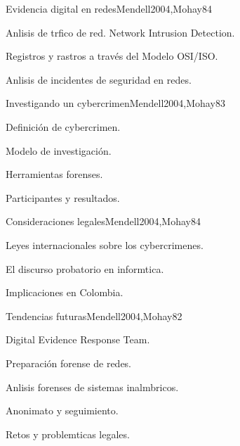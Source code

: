 \begin{syllabus}
\begin{unit}{Evidencia digital en redes}{Mendell2004,Mohay}{8}{4}
\begin{topics}
      \item {Anlisis de trfico de red. Network Intrusion Detection.}
      \item {Registros y rastros a través del Modelo OSI/ISO.}
      \item {Anlisis de incidentes de seguridad en redes.}
\end{topics}
\end{unit}

\begin{unit}{Investigando un cybercrimen}{Mendell2004,Mohay}{8}{3}
\begin{topics}
      \item {Definición de cybercrimen.}
      \item {Modelo de investigación.}
      \item {Herramientas forenses.}
      \item {Participantes y resultados.}
\end{topics}
\end{unit}

\begin{unit}{Consideraciones legales}{Mendell2004,Mohay}{8}{4}
\begin{topics}
      \item {Leyes internacionales sobre los cybercrimenes.}
      \item {El discurso probatorio en informtica.}
      \item {Implicaciones en Colombia.}
\end{topics}
\end{unit}

\begin{unit}{Tendencias futuras}{Mendell2004,Mohay}{8}{2}
\begin{topics}
      \item {Digital Evidence Response Team.}
      \item {Preparación forense de redes.}
      \item {Anlisis forenses de sistemas inalmbricos.}
      \item {Anonimato y seguimiento.}
      \item {Retos y problemticas legales.}
\end{topics}
\end{unit}

\begin{coursebibliography}
\end{coursebibliography}

\end{syllabus}

%
